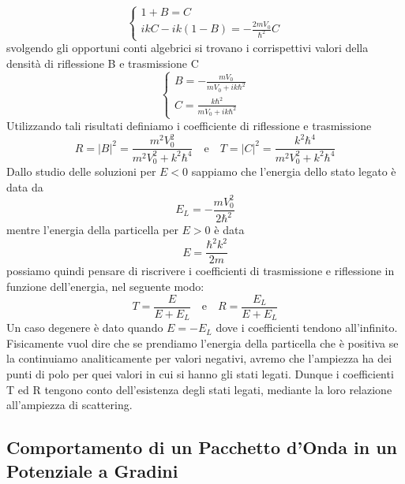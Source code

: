 \begin{equation*}
	\begin{cases}
		1+B =C \\
		ikC - ik(1-B) = -\frac{2mV_0}{\hbar^2}C
	\end{cases}
\end{equation*}
svolgendo gli opportuni conti algebrici si trovano i corrispettivi valori della densit\`a di riflessione B e trasmissione C
\begin{equation*}
	\begin{cases}
		B = - \frac{mV_0}{mV_0 + ik\hbar^2} \\
		C = \frac{k\hbar^2}{mV_0 + ik \hbar^2}
	\end{cases}
\end{equation*}
Utilizzando tali risultati definiamo i coefficiente di riflessione e trasmissione
\begin{equation}
	R = |B|^2 = \frac{m^2V_0^2}{m^2V_0^2 + k^2\hbar^4} \quad \text{e} \quad  T = |C|^2 = \frac{k^2 \hbar^4}{m^2V_0^2 + k^2\hbar^4}
\end{equation}
Dallo studio delle soluzioni per $E < 0$ sappiamo che l'energia dello stato legato \`e data da 
\begin{equation*}
	E_L = -\frac{mV_0^2}{2\hbar^2} 
\end{equation*}
mentre l'energia della particella per $E>0$ \`e data 
\begin{equation*}
	E = \frac{\hbar^2k^2}{2m}
\end{equation*}
possiamo quindi pensare di riscrivere i coefficienti di trasmissione e riflessione in funzione dell'energia, nel seguente modo:
\begin{equation}
	T = \frac{E}{E + E_L} \quad \text{e} \quad R = \frac{E_L}{E+E_L}
\end{equation}
Un caso degenere \`e dato quando $E = - E_L$ dove i coefficienti tendono all'infinito. Fisicamente vuol dire che se prendiamo l'energia della particella che \`e positiva se la continuiamo analiticamente per valori negativi, avremo che l'ampiezza ha dei punti di polo per quei valori in cui si hanno gli stati legati. Dunque i coefficienti T ed R tengono conto dell'esistenza degli stati legati, mediante la loro relazione all'ampiezza di scattering.

\subsection{Comportamento di un Pacchetto d'Onda in un Potenziale a Gradini }

